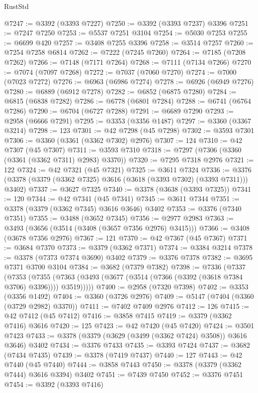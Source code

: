 \begin{lexlean}{RustStd}
\begin{coremodule}
@7247 := @3392 (@3393 @7227)
@7250 := @3392 (@3393 @7237) @3396
@7251 := @7247 @7250
@7253 := @5537 @7251 @3104
@7254 := @5030 @7253
@7255 := @6699 @420
@7257 := @3408 @7255 @3396
@7258 := @3514 @7257
@7260 := @7254 @7258 @6814
@7262 := @7222 (@7245 @7260)
@7264 := @7185 (@7208 @7262)
@7266 := @7148 (@7171 @7264)
@7268 := @7111 (@7134 @7266)
@7270 := @7074 (@7097 @7268)
@7272 := @7037 (@7060 @7270)
@7274 := @7000 (@7023 @7272)
@7276 := @6963 (@6986 @7274)
@7278 := @6926 (@6949 @7276)
@7280 := @6889 (@6912 @7278)
@7282 := @6852 (@6875 @7280)
@7284 := @6815 (@6838 @7282)
@7286 := @6778 (@6801 @7284)
@7288 := @6741 (@6764 @7286)
@7290 := @6704 (@6727 @7288)
@7291 := @6689 @7290
@7293 := @2958 (@6666 @7291)
@7295 := @3353 (@3356 @1487)
@7297 := @3360 (@3367 @3214)
@7298 := 123
@7301 := @42 @7298 (@45 @7298)
@7302 := @3593 @7301
@7306 := @3360 (@3361 (@3362 @7302) @2976)
@7307 := 124
@7310 := @42 @7307 (@45 @7307)
@7311 := @3593 @7310
@7318 := @7297 (@7306 (@3360 (@3361 (@3362 @7311) @2983) @3370))
@7320 := @7295 @7318 @2976
@7321 := 122
@7324 := @42 @7321 (@45 @7321)
@7325 := @3611 @7324
@7336 := @3376 (@3378 (@3379 (@3362 @7325) @3616 (@3618 (@3393 @7302) (@3393 @7311))) @3402)
@7337 := @3627 @7325
@7340 := @3378 (@3638 (@3393 @7325))
@7341 := 120
@7344 := @42 @7341 (@45 @7341)
@7345 := @3611 @7344
@7351 := @3378 (@3379 (@3362 @7345) @3616 @3646) @3402
@7353 := @3376 (@7340 @7351)
@7355 := @3488 (@3652 @7345)
@7356 := @2977 @2983
@7363 := @3493 (@3656 (@3514 (@3408 (@3657 @7356 @2976) @3415)))
@7366 := @3408 (@3678 @7356 @2976)
@7367 := 121
@7370 := @42 @7367 (@45 @7367)
@7371 := @3684 @7370
@7373 := @3379 (@3362 @7371)
@7374 := @3384 @3214
@7378 := @3378 (@7373 @7374 @3690) @3402
@7379 := @3376 @7378
@7382 := @3695 @7371 @3700 @3104
@7384 := @3682 (@7379 @7382)
@7398 := @7336
    (@7337
      (@7353
        (@7355 (@7363 (@3493 (@3677 (@3514 (@7366 (@3392 (@3618 @7384 @3706) @3396)))) @3519)))))
@7400 := @2958 (@7320 @7398)
@7402 := @3353 (@3356 @1492)
@7404 := @3360 (@3726 @2976)
@7409 := @5147 (@7404 (@3360 (@3729 @2982) @3370))
@7411 := @7402 @7409 @2976
@7412 := 126
@7415 := @42 @7412 (@45 @7412)
@7416 := @3858 @7415
@7419 := @3379 (@3362 @7416) @3616
@7420 := 125
@7423 := @42 @7420 (@45 @7420)
@7424 := @3501 @7423
@7433 := @3378 (@3379 (@3629 (@3499 (@3362 @7424) @3508)) @3616 @3646) @3402
@7434 := @3376 @7433
@7435 := @3393 @7424
@7437 := @3682 (@7434 @7435)
@7439 := @3378 (@7419 @7437)
@7440 := 127
@7443 := @42 @7440 (@45 @7440)
@7444 := @3858 @7443
@7450 := @3378 (@3379 (@3362 @7444) @3616 @3394) @3402
@7451 := @7439 @7450
@7452 := @3376 @7451
@7454 := @3392 (@3393 @7416)

\end{coremodule}
\end{lexlean}
